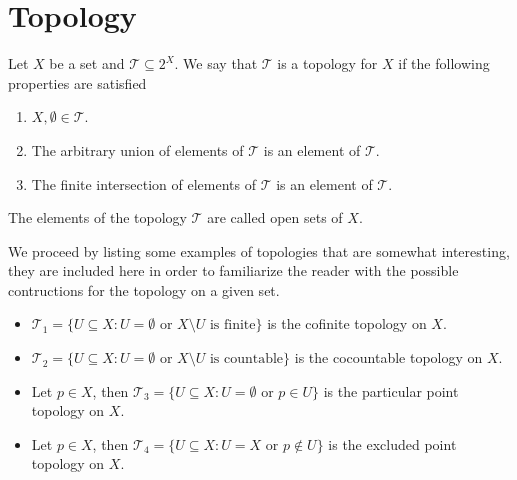 \section{Topology}


\begin{definition}[Topology]\label{def:topology}
Let \(X\) be a set and \(\mathcal T \subseteq 2^X\). We say that \(\mathcal T\)
is a topology for \(X\) if the following properties are satisfied
\begin{enumerate}[(T1)]\setlength\itemsep{0em}
\item\label{item:topology-T1}
  \(X, \emptyset \in \mathcal T\).

\item\label{item:topology-T2}
  The arbitrary union of elements of \(\mathcal T\) is an element of
  \(\mathcal T\).

\item\label{item:topology-T3}
  The finite intersection of elements of \(\mathcal T\) is an element of
  \(\mathcal T\).
\end{enumerate}
The elements of the topology \(\mathcal T\) are called open sets of \(X\).
\end{definition}

\begin{example}\label{exp:some-topologies}
We proceed by listing some examples of topologies that are somewhat interesting,
they are included here in order to familiarize the reader with the possible
contructions for the topology on a given set.
\begin{itemize}\setlength\itemsep{0em}
\item \(\mathcal T_1 = \{U \subseteq X : U = \emptyset \text{ or
  } X \setminus U \text{ is finite}\}\) is the cofinite topology on \(X\).

\item \(\mathcal T_2 = \{U \subseteq X : U = \emptyset \text{ or
  } X \setminus U \text{ is countable}\}\) is the cocountable topology on \(X\).

\item Let \(p \in X\), then \(\mathcal T_3 = \{U \subseteq X : U = \emptyset
  \text{ or } p \in U\}\) is the particular point topology on \(X\).

\item Let \(p \in X\), then \(\mathcal T_4 = \{U \subseteq X : U = X \text{ or }
  p \not\in U\}\) is the excluded point topology on \(X\).
\end{itemize}
\end{example}

